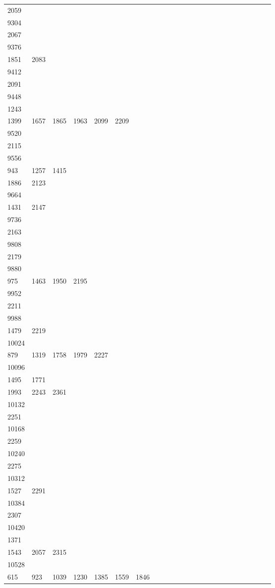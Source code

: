 \begin{longtable}{*{24}{l}}
2059& \\
9304&&&&&&&&&\\
2067& \\
9376&&&&&&&&&\\
1851& 2083& \\
9412&&&&&&&&&\\
2091& \\
9448&&&&&&&&&\\
1243\\
1399& 1657& 1865& 1963& 2099& 2209& \\
9520&&&&&&&&&\\
2115& \\
9556&&&&&&&&&\\
943& 1257& 1415\\
1886& 2123& \\
9664&&&&&&&&&\\
1431& 2147& \\
9736&&&&&&&&&\\
2163& \\
9808&&&&&&&&&\\
2179& \\
9880&&&&&&&&&\\
975& 1463& 1950& 2195\\
9952&&&&&&&&&\\
2211& \\
9988&&&&&&&&&\\
1479& 2219& \\
10024&&&&&&&&&\\
879& 1319& 1758& 1979& 2227& \\
10096&&&&&&&&&\\
1495& 1771\\
1993& 2243& 2361& \\
10132&&&&&&&&&\\
2251& \\
10168&&&&&&&&&\\
2259& \\
10240&&&&&&&&&\\
2275& \\
10312&&&&&&&&&\\
1527& 2291& \\
10384&&&&&&&&&\\
2307& \\
10420&&&&&&&&&\\
1371\\
1543& 2057& 2315& \\
10528&&&&&&&&&\\
615& 923& 1039& 1230& 1385& 1559& 1846\\

\end{longtable}
